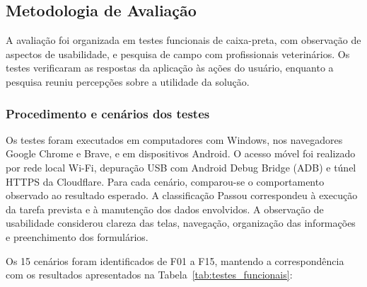 \documentclass{UNESC}
\begin{document}

\subsection{Metodologia de Avaliação}

A avaliação foi organizada em testes funcionais de caixa-preta, com observação de aspectos de usabilidade, e pesquisa de campo com profissionais veterinários. Os testes verificaram as respostas da aplicação às ações do usuário, enquanto a pesquisa reuniu percepções sobre a utilidade da solução.

\subsubsection{Procedimento e cenários dos testes}

Os testes foram executados em computadores com Windows, nos navegadores Google Chrome e Brave, e em dispositivos Android. O acesso móvel foi realizado por rede local Wi-Fi, depuração USB com Android Debug Bridge (ADB) e túnel HTTPS da Cloudflare. Para cada cenário, comparou-se o comportamento observado ao resultado esperado. A classificação Passou correspondeu à execução da tarefa prevista e à manutenção dos dados envolvidos. A observação de usabilidade considerou clareza das telas, navegação, organização das informações e preenchimento dos formulários.

Os 15 cenários foram identificados de F01 a F15, mantendo a correspondência com os resultados apresentados na Tabela~\ref{tab:testes_funcionais}:
\end{document}
